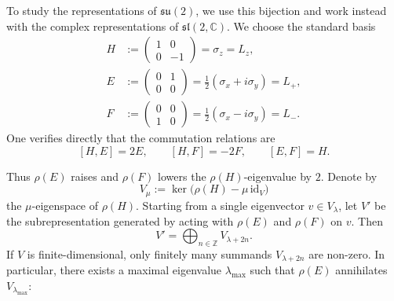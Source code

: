 To study the representations of $\mathfrak{su}(2)$, we use this bijection and work instead
with the complex representations of $\mathfrak{sl}(2,\mathbb{C})$. We choose the standard basis
\begin{align*}
    H &:= \begin{pmatrix}1&0\\0&-1\end{pmatrix} = \sigma_z = L_z,\\[4pt]
    E &:= \begin{pmatrix}0&1\\0&0\end{pmatrix} = \tfrac{1}{2}(\sigma_x + i\sigma_y) = L_+,\\[4pt]
    F &:= \begin{pmatrix}0&0\\1&0\end{pmatrix} = \tfrac{1}{2}(\sigma_x - i\sigma_y) = L_-.
\end{align*}
One verifies directly that the commutation relations are
\[
    [H,E] = 2E, \qquad [H,F]=-2F, \qquad [E,F]=H.
\]


Thus $\rho(E)$ raises and $\rho(F)$ lowers the $\rho(H)$-eigenvalue by $2$. Denote by
\[
    V_\mu := \ker\!\bigl(\rho(H) - \mu\,\mathrm{id}_V\bigr)
\]
the $\mu$-eigenspace of $\rho(H)$. Starting from a single eigenvector $v\in V_\lambda$, let $V'$
be the subrepresentation generated by acting with $\rho(E)$ and $\rho(F)$ on $v$. Then
\[
    V' = \bigoplus_{n\in\mathbb{Z}} V_{\lambda+2n}.
\]
If $V$ is finite-dimensional, only finitely many summands $V_{\lambda+2n}$ are non-zero. In
particular, there exists a maximal eigenvalue $\lambda_{\max}$ such that $\rho(E)$ annihilates
$V_{\lambda_{\max}}$:

